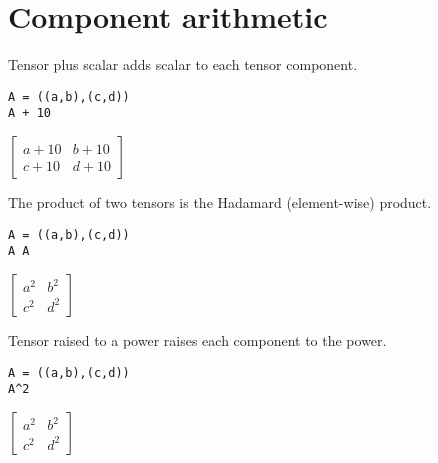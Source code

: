 \documentclass[12pt]{article}
\begin{document}
\section*{Component arithmetic}

Tensor plus scalar adds scalar to each tensor component.

{\color{blue}
\begin{verbatim}
A = ((a,b),(c,d))
A + 10
\end{verbatim}}

$\displaystyle
\begin{bmatrix}
a+10 & b+10
\\[1ex]
c+10 & d+10
\end{bmatrix}
$

\bigskip
The product of two tensors is the Hadamard (element-wise) product.

{\color{blue}
\begin{verbatim}
A = ((a,b),(c,d))
A A
\end{verbatim}}

$\displaystyle
\begin{bmatrix}
a^2 & b^2
\\[1ex]
c^2 & d^2
\end{bmatrix}
$

\bigskip

Tensor raised to a power raises each component to the power.

{\color{blue}
\begin{verbatim}
A = ((a,b),(c,d))
A^2
\end{verbatim}}

$\displaystyle
\begin{bmatrix}
a^2 & b^2
\\[1ex]
c^2 & d^2
\end{bmatrix}
$
\end{document}
